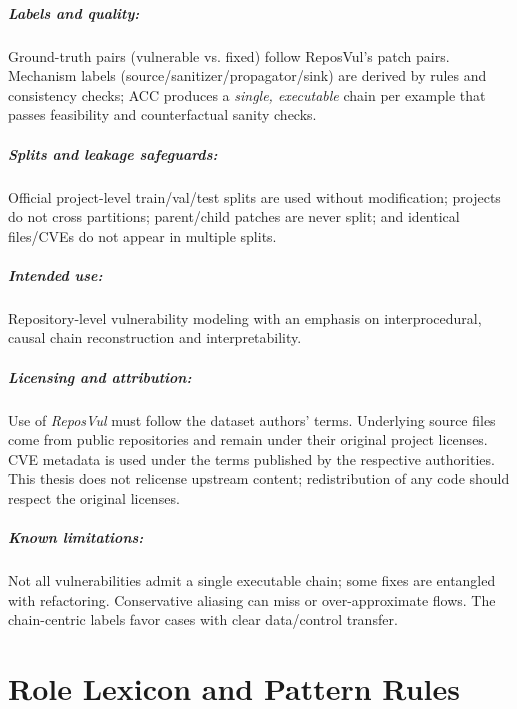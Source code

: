 \documentclass{buthesis}
\begin{document}
\begin{appendices}
\paragraph{Labels and quality:}
Ground-truth pairs (vulnerable vs. fixed) follow ReposVul’s patch pairs.
Mechanism labels (source/sanitizer/propagator/sink) are derived by rules and
consistency checks; ACC produces a \emph{single, executable} chain per example that
passes feasibility and counterfactual sanity checks.

\paragraph{Splits and leakage safeguards:}
Official project-level train/val/test splits are used without modification;
projects do not cross partitions; parent/child patches are never split; and
identical files/CVEs do not appear in multiple splits.

\paragraph{Intended use:}
Repository-level vulnerability modeling with an emphasis on interprocedural,
causal chain reconstruction and interpretability.

\paragraph{Licensing and attribution:}
Use of \emph{ReposVul} must follow the dataset authors’ terms.
Underlying source files come from public repositories and remain under their
original project licenses. CVE metadata is used under the terms published by
the respective authorities. This thesis does not relicense upstream content;
redistribution of any code should respect the original licenses.

\paragraph{Known limitations:}
Not all vulnerabilities admit a single executable chain; some fixes are entangled
with refactoring. Conservative aliasing can miss or over-approximate flows.
The chain-centric labels favor cases with clear data/control transfer.


\chapter{Role Lexicon and Pattern Rules}
\label{app:role-lexicon}


\end{appendices}
\end{document}
